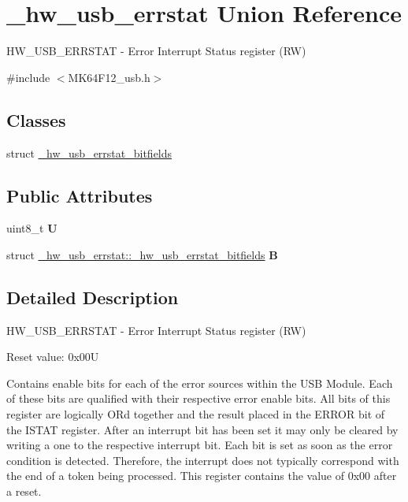 \hypertarget{union__hw__usb__errstat}{}\section{\+\_\+hw\+\_\+usb\+\_\+errstat Union Reference}
\label{union__hw__usb__errstat}


H\+W\+\_\+\+U\+S\+B\+\_\+\+E\+R\+R\+S\+T\+AT -\/ Error Interrupt Status register (RW)  




{\ttfamily \#include $<$M\+K64\+F12\+\_\+usb.\+h$>$}

\subsection*{Classes}
\begin{DoxyCompactItemize}
\item 
struct \hyperlink{struct__hw__usb__errstat_1_1__hw__usb__errstat__bitfields}{\+\_\+hw\+\_\+usb\+\_\+errstat\+\_\+bitfields}
\end{DoxyCompactItemize}
\subsection*{Public Attributes}
\begin{DoxyCompactItemize}
\item 
uint8\+\_\+t {\bfseries U}\hypertarget{union__hw__usb__errstat_a8f11e9a606206a7c8917beac3886418a}{}\label{union__hw__usb__errstat_a8f11e9a606206a7c8917beac3886418a}

\item 
struct \hyperlink{struct__hw__usb__errstat_1_1__hw__usb__errstat__bitfields}{\+\_\+hw\+\_\+usb\+\_\+errstat\+::\+\_\+hw\+\_\+usb\+\_\+errstat\+\_\+bitfields} {\bfseries B}\hypertarget{union__hw__usb__errstat_aa74a2e35b4e52b0e739a71f902346d4f}{}\label{union__hw__usb__errstat_aa74a2e35b4e52b0e739a71f902346d4f}

\end{DoxyCompactItemize}


\subsection{Detailed Description}
H\+W\+\_\+\+U\+S\+B\+\_\+\+E\+R\+R\+S\+T\+AT -\/ Error Interrupt Status register (RW) 

Reset value\+: 0x00U

Contains enable bits for each of the error sources within the U\+SB Module. Each of these bits are qualified with their respective error enable bits. All bits of this register are logically OR\textquotesingle{}d together and the result placed in the E\+R\+R\+OR bit of the I\+S\+T\+AT register. After an interrupt bit has been set it may only be cleared by writing a one to the respective interrupt bit. Each bit is set as soon as the error condition is detected. Therefore, the interrupt does not typically correspond with the end of a token being processed. This register contains the value of 0x00 after a reset. 

